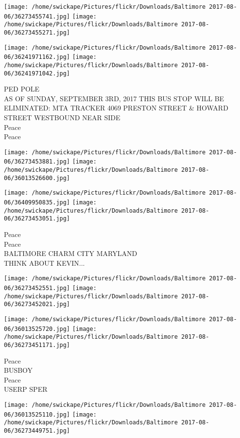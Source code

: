 \documentclass[10pt,letterpaper]{article}
\begin{document}
\texttt{[image: /home/swickape/Pictures/flickr/Downloads/Baltimore 2017-08-06/36273455741.jpg]}
\texttt{[image: /home/swickape/Pictures/flickr/Downloads/Baltimore 2017-08-06/36273455271.jpg]}

\texttt{[image: /home/swickape/Pictures/flickr/Downloads/Baltimore 2017-08-06/36241971162.jpg]}
\texttt{[image: /home/swickape/Pictures/flickr/Downloads/Baltimore 2017-08-06/36241971042.jpg]}

PED POLE\\
AS OF SUNDAY, SEPTEMBER 3RD, 2017 THIS BUS STOP WILL BE ELIMINATED: MTA TRACKER 4069 PRESTON STREET \& HOWARD STREET WESTBOUND NEAR SIDE\\
Peace\\
Peace\\
\pagebreak

\texttt{[image: /home/swickape/Pictures/flickr/Downloads/Baltimore 2017-08-06/36273453881.jpg]}
\texttt{[image: /home/swickape/Pictures/flickr/Downloads/Baltimore 2017-08-06/36013526600.jpg]}

\texttt{[image: /home/swickape/Pictures/flickr/Downloads/Baltimore 2017-08-06/36409950835.jpg]}
\texttt{[image: /home/swickape/Pictures/flickr/Downloads/Baltimore 2017-08-06/36273453051.jpg]}

Peace\\
Peace\\
BALTIMORE CHARM CITY MARYLAND\\
THINK ABOUT KEVIN...\\
\pagebreak

\texttt{[image: /home/swickape/Pictures/flickr/Downloads/Baltimore 2017-08-06/36273452551.jpg]}
\texttt{[image: /home/swickape/Pictures/flickr/Downloads/Baltimore 2017-08-06/36273452021.jpg]}

\texttt{[image: /home/swickape/Pictures/flickr/Downloads/Baltimore 2017-08-06/36013525720.jpg]}
\texttt{[image: /home/swickape/Pictures/flickr/Downloads/Baltimore 2017-08-06/36273451171.jpg]}

Peace\\
BUSBOY\\
Peace\\
USERP SPER\\
\pagebreak

\texttt{[image: /home/swickape/Pictures/flickr/Downloads/Baltimore 2017-08-06/36013525110.jpg]}
\texttt{[image: /home/swickape/Pictures/flickr/Downloads/Baltimore 2017-08-06/36273449751.jpg]}
\end{document}
